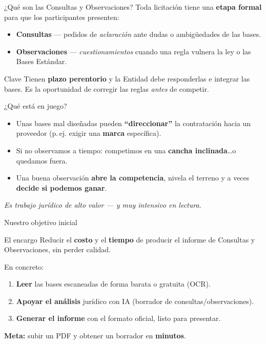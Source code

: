 \documentclass[10pt,aspectratio=169]{beamer}
\begin{document}
\begin{frame}{¿Qué son las Consultas y Observaciones?}
  Toda licitación tiene una \textbf{etapa formal} para que los participantes presenten:
  \begin{itemize}
    \item \textbf{Consultas} — pedidos de \emph{aclaración} ante dudas o ambigüedades de las bases.
    \item \textbf{Observaciones} — \emph{cuestionamientos} cuando una regla vulnera la ley o las Bases Estándar.
  \end{itemize}
  \begin{block}{Clave}
    Tienen \textbf{plazo perentorio} y la Entidad debe responderlas e integrar las bases. Es la oportunidad de corregir las reglas \emph{antes} de competir.
  \end{block}
\end{frame}

\begin{frame}{¿Qué está en juego?}
  \begin{itemize}
    \item Unas bases mal diseñadas pueden \textbf{``direccionar''} la contratación hacia un proveedor (p.\,ej. exigir una \textbf{marca} específica).
    \item Si no observamos a tiempo: competimos en una \textbf{cancha inclinada}\ldots o quedamos fuera.
    \item Una buena observación \textbf{abre la competencia}, nivela el terreno y a veces \textbf{decide si podemos ganar}.
  \end{itemize}
  \vfill
  \centering\footnotesize\emph{Es trabajo jurídico de alto valor — y muy intensivo en lectura.}
\end{frame}

\begin{frame}{Nuestro objetivo inicial}
  \begin{block}{El encargo}
    Reducir el \textbf{costo} y el \textbf{tiempo} de producir el informe de Consultas y Observaciones, sin perder calidad.
  \end{block}
  En concreto:
  \begin{enumerate}
    \item \textbf{Leer} las bases escaneadas de forma barata o gratuita (OCR).
    \item \textbf{Apoyar el análisis} jurídico con IA (borrador de consultas/observaciones).
    \item \textbf{Generar el informe} con el formato oficial, listo para presentar.
  \end{enumerate}
  \centering\textbf{Meta:} subir un PDF y obtener un borrador en \textbf{minutos}.
\end{frame}
\end{document}
